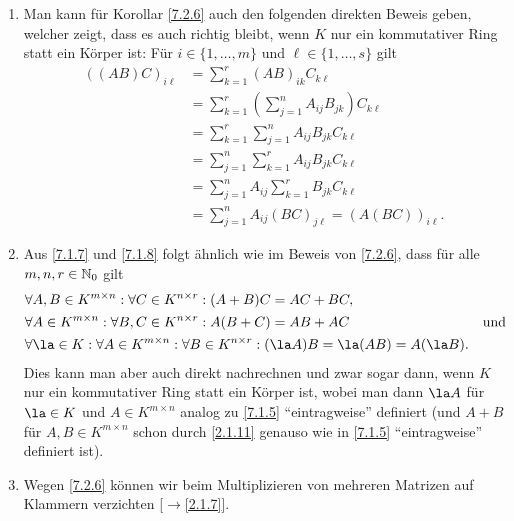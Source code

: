 \documentclass[../../main.tex]{subfiles}
\begin{document}
\begin{bem}\label{7.2.7}
\begin{enumerate}[\normalfont(a)]
\item
Man kann für Korollar \ref{7.2.6} auch den folgenden direkten Beweis geben, welcher zeigt, dass es auch richtig bleibt, wenn $K$ nur ein kommutativer Ring statt ein Körper ist:
Für $i\in\{1,\dots,m\}$ und $\ell\in\{1,\dots,s\}$ gilt
\begin{align*}
((AB)C)_{i\ell}&=\sum_{k=1}^r(AB)_{ik}C_{k\ell}\\
&=\sum_{k=1}^r\left(\sum_{j=1}^nA_{ij}B_{jk}\right)C_{k\ell}\\
&=\sum_{k=1}^r\sum_{j=1}^nA_{ij}B_{jk}C_{k\ell}\\
&=\sum_{j=1}^n\sum_{k=1}^rA_{ij}B_{jk}C_{k\ell}\\
&=\sum_{j=1}^nA_{ij}\sum_{k=1}^rB_{jk}C_{k\ell}\\
&=\sum_{j=1}^nA_{ij}(BC)_{j\ell}=(A(BC))_{i\ell}.
\end{align*}
\item Aus \ref{7.1.7} und \ref{7.1.8} folgt ähnlich wie im Beweis von \ref{7.2.6}, dass für alle $m,n,r\in\mathbb N_0$ gilt
\begin{align*}
&\forall A,B\in K^{m\times n}:\forall C\in K^{n\times r}:(A+B)C=AC+BC,\\
&\forall A\in K^{m\times n}:\forall B,C\in K^{n\times r}:A(B+C)=AB+AC&\text{und}\\
&\forall\la\in K:\forall A\in K^{m\times n}:\forall B\in K^{n\times r}:(\la A)B=\la(AB)=A(\la B).
\end{align*}
Dies kann man aber auch direkt nachrechnen und zwar sogar dann, wenn $K$ nur ein kommutativer Ring statt ein Körper ist, wobei man dann $\la A$ für $\la\in K$ und
$A\in K^{m\times n}$ analog zu \ref{7.1.5} "`eintragweise"' definiert (und $A+B$ für $A,B\in K^{m\times n}$ schon durch \ref{2.1.11} genauso wie in \ref{7.1.5} "`eintragweise"' definiert ist).
\item Wegen \ref{7.2.6} können wir beim Multiplizieren von mehreren Matrizen auf Klammern verzichten [$\to$\ref{2.1.7}].
\end{enumerate}
\end{bem}
\end{document}
